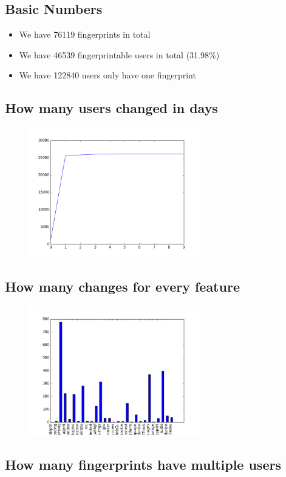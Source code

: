 \documentclass[10pt, conference, compsocconf]{IEEEtran}
\begin{document}
\subsection{Basic Numbers}
\begin{itemize}\item We have 76119 fingerprints in total\item We have 46539 fingerprintable users in total (31.98\%)\item We have 122840 users only have one fingerprint \end{itemize}\subsection{How many users changed in days}
\begin{figure}[H]\centering\includegraphics[width=75mm,scale=0.5]{BasedonCookiechangebytime}\end{figure}\subsection{How many changes for every feature}
\begin{figure}[H]\centering\includegraphics[width=75mm,scale=0.5]{BasedonCookiefeaturechange}\end{figure}\subsection{How many fingerprints have multiple users}
\end{document}
